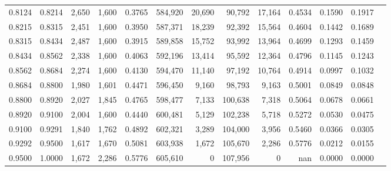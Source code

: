 \begin{tabular}{rrrrrrrrrrrrr}
0.8124 & 0.8214 &  2,650 & 1,600 &                                     0.3765 & 584,920 &  20,690 &  90,792 &  17,164 & 0.4534 & 0.1590 & 0.1917 \\
0.8215 & 0.8315 &  2,451 & 1,600 &                                     0.3950 & 587,371 &  18,239 &  92,392 &  15,564 & 0.4604 & 0.1442 & 0.1689 \\
0.8315 & 0.8434 &  2,487 & 1,600 &                                     0.3915 & 589,858 &  15,752 &  93,992 &  13,964 & 0.4699 & 0.1293 & 0.1459 \\
0.8434 & 0.8562 &  2,338 & 1,600 &                                     0.4063 & 592,196 &  13,414 &  95,592 &  12,364 & 0.4796 & 0.1145 & 0.1243 \\
0.8562 & 0.8684 &  2,274 & 1,600 &                                     0.4130 & 594,470 &  11,140 &  97,192 &  10,764 & 0.4914 & 0.0997 & 0.1032 \\
0.8684 & 0.8800 &  1,980 & 1,601 &                                     0.4471 & 596,450 &   9,160 &  98,793 &   9,163 & 0.5001 & 0.0849 & 0.0848 \\
0.8800 & 0.8920 &  2,027 & 1,845 &                                     0.4765 & 598,477 &   7,133 & 100,638 &   7,318 & 0.5064 & 0.0678 & 0.0661 \\
0.8920 & 0.9100 &  2,004 & 1,600 &                                     0.4440 & 600,481 &   5,129 & 102,238 &   5,718 & 0.5272 & 0.0530 & 0.0475 \\
0.9100 & 0.9291 &  1,840 & 1,762 &                                     0.4892 & 602,321 &   3,289 & 104,000 &   3,956 & 0.5460 & 0.0366 & 0.0305 \\
0.9292 & 0.9500 &  1,617 & 1,670 &                                     0.5081 & 603,938 &   1,672 & 105,670 &   2,286 & 0.5776 & 0.0212 & 0.0155 \\
0.9500 & 1.0000 &  1,672 & 2,286 &                                     0.5776 & 605,610 &       0 & 107,956 &       0 &    nan & 0.0000 & 0.0000 \\
\bottomrule
\end{tabular}
